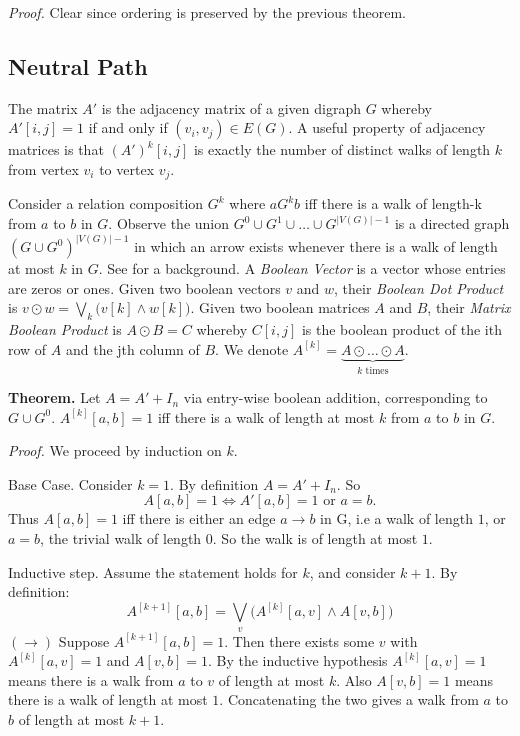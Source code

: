 \textit{Proof.} Clear since ordering is preserved by the previous theorem.


\subsection{Neutral Path} \label{Neutral Path}

The matrix $A'$ is the adjacency matrix of a given digraph $G$ whereby $A'[i,j] = 1$ if and only if $(v_i, v_j) \in E(G)$. A useful property of adjacency matrices is that $(A')^k[i,j]$ is exactly the number of distinct walks of length $k$ from vertex $v_i$ to vertex $v_j$. 

Consider a relation composition $G^k$ where $a G^k b$ iff there is a walk of length-k from $a$ to $b$ in $G$. Observe the union $G^0 \cup G^1 \cup \dots \cup G^{|V(G)|-1}$ is a directed graph $(G \cup G^0)^{|V(G)|-1}$ in which an arrow exists whenever there is a walk of length at most $k$ in $G$. See \cite{discreteHandbook} for a background. A \textit{Boolean Vector} is a vector whose entries are zeros or ones. Given two boolean vectors $v$ and $w$, their \textit{Boolean Dot Product} is $v \odot w = \bigvee_k \big ( v[k] \wedge w[k] \big )$. Given two boolean matrices $A$ and $B$, their \textit{Matrix Boolean Product} is $A \odot B = C$ whereby $C[i,j]$ is the boolean product of the ith row of $A$ and the jth column of $B$. We denote $A^{[k]} = \underbrace{A \odot \dots \odot A}_{k \text{ times}}$.

\textbf{Theorem.} Let $A = A' + I_n$ via entry-wise boolean addition, corresponding to $G \cup G^0$. $A^{[k]}[a,b] = 1$ iff there is a walk of length at most $k$ from $a$ to $b$ in $G$.

\textit{Proof.} We proceed by induction on $k$.

Base Case. Consider $k = 1$. By definition $A = A' + I_n$. So
$$
A[ a,b ] = 1 \iff A'[a,b]=1 \text{ or } a = b.
$$
Thus $A[a,b]=1$ iff there is either an edge $a \to b$ in G, i.e a walk of length $1$, or $a=b$, the trivial walk of length $0$. So the walk is of length at most $1$.

Inductive step. Assume the statement holds for $k$, and consider $k+1$. By definition:
$$
A^{[k+1]}[a,b] = \bigvee_{v} \big( A^{[k]}[a,v] \land A[v,b] \big)
$$
$(\rightarrow)$ Suppose $A^{[k+1]}[a,b] = 1$. Then there exists some $v$ with $A^{[k]}[a,v]=1$ and $A[v,b]=1$. By the inductive hypothesis $A^{[k]}[a,v]=1$ means there is a walk from $a$ to $v$ of length at most $k$. Also $A[v,b]=1$ means there is a walk of length at most $1$. Concatenating the two gives a walk from $a$ to $b$ of length at most $k+1$.

